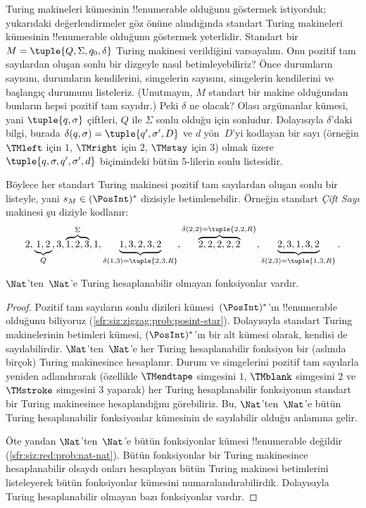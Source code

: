 \begin{explain}
Turing makineleri kümesinin !!{enumerable} olduğunu göstermek istiyorduk;
yukarıdaki değerlendirmeler göz önüne alındığında standart Turing makineleri
kümesinin !!{enumerable} olduğunu göstermek yeterlidir. Standart bir
$M=\tuple{Q,\Sigma,q_0,\delta}$ Turing makinesi verildiğini varsayalım. Onu
pozitif tam sayılardan oluşan sonlu bir dizgeyle nasıl betimleyebiliriz? Önce
durumların sayısını, durumların kendilerini, simgelerin sayısını, simgelerin
kendilerini ve başlangıç durumunu listeleriz. (Unutmayın, $M$ standart bir
makine olduğundan bunların hepsi pozitif tam sayıdır.) Peki $\delta$ ne olacak?
Olası argümanlar kümesi, yani $\tuple{q,\sigma}$ çiftleri, $Q$ ile $\Sigma$
sonlu olduğu için sonludur. Dolayısıyla $\delta$'daki bilgi, burada
$\delta(q,\sigma)=\tuple{q',\sigma',D}$ ve $d$ yön~$D$'yi kodlayan bir sayı
(örneğin $\TMleft$ için $1$, $\TMright$ için $2$, $\TMstay$ için $3$) olmak
üzere $\tuple{q,\sigma,q',\sigma',d}$ biçimindeki bütün $5$-lilerin sonlu
listesidir.

Böylece her standart Turing makinesi pozitif tam sayılardan oluşan sonlu bir
listeyle, yani $s_M\in(\PosInt)^*$ dizisiyle betimlenebilir. Örneğin standart
\emph{Çift Sayı} makinesi şu diziyle kodlanır:
\[
2, \underbrace{1, 2}_Q, 3, \overbrace{1, 2, 3}^\Sigma, 1, \underbrace{1, 3, 2, 3, 2}_{\delta(1,3) = \tuple{2,3,R}}, 
\overbrace{2, 2, 2, 2, 2}^{\delta(2,2) = \tuple{2,2,R}},
\underbrace{2, 3, 1, 3, 2}_{\delta(2,3) = \tuple{1,3,R}}.
\]
\end{explain}

\begin{thm}
$\Nat$'ten~$\Nat$'e Turing hesaplanabilir olmayan fonksiyonlar vardır.
\end{thm}

\begin{proof}
Pozitif tam sayıların sonlu dizileri kümesi~$(\PosInt)^*$'ın !!{enumerable}
olduğunu biliyoruz (\cref{sfr:siz:zigzag:prob:posint-star}). Dolayısıyla
standart Turing makinelerinin betimleri kümesi, $(\PosInt)^*$'ın bir alt
kümesi olarak, kendisi de sayılabilirdir. $\Nat$'ten~$\Nat$'e her Turing
hesaplanabilir fonksiyon bir (aslında birçok) Turing makinesince hesaplanır.
Durum ve simgelerini pozitif tam sayılarla yeniden adlandırarak (özellikle
$\TMendtape$ simgesini $1$, $\TMblank$ simgesini $2$ ve $\TMstroke$ simgesini
$3$ yaparak) her Turing hesaplanabilir fonksiyonun standart bir Turing
makinesince hesaplandığını görebiliriz. Bu, $\Nat$'ten~$\Nat$'e bütün Turing
hesaplanabilir fonksiyonlar kümesinin de sayılabilir olduğu anlamına gelir.

Öte yandan $\Nat$'ten~$\Nat$'e bütün fonksiyonlar kümesi !!{enumerable}
değildir (\cref{sfr:siz:red:prob:nat-nat}). Bütün fonksiyonlar bir Turing
makinesince hesaplanabilir olsaydı onları hesaplayan bütün Turing makinesi
betimlerini listeleyerek bütün fonksiyonlar kümesini numaralandırabilirdik.
Dolayısıyla Turing hesaplanabilir olmayan bazı fonksiyonlar vardır.
\end{proof}

